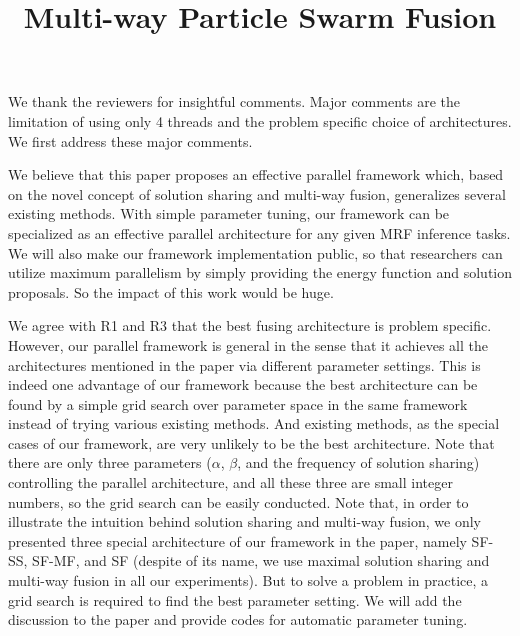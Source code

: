 \documentclass[runningheads]{llncs}
\begin{document}
\pagestyle{headings}
\mainmatter
\def\ECCV16SubNumber{1569}  %

\title{Multi-way Particle Swarm Fusion}

\maketitle
\thispagestyle{empty}


We thank the reviewers for insightful comments. Major comments are
the limitation of using only 4 threads and the problem specific choice of architectures. We first address these major comments.

\vspace{0.15cm}
 We
believe that this paper proposes an effective parallel
framework which, based on the novel concept of solution
sharing and multi-way fusion, generalizes several existing
methods. With simple parameter tuning, our framework can be
specialized as an effective parallel architecture for any
given MRF inference tasks. We will also make our framework
implementation public, so that researchers can utilize
maximum parallelism by simply providing the energy function
and solution proposals. So the impact of this work would be
huge.

\vspace{0.15cm}
 We agree with
R1 and R3 that the best fusing architecture is problem
specific. However, our parallel framework is general in the
sense that it achieves all the architectures mentioned in
the paper via different parameter settings. This is indeed
one advantage of our framework because the best architecture
can be found by a simple grid search over parameter space in
the same framework instead of trying various existing
methods. And existing methods, as the special cases of our
framework, are very unlikely to be the best
architecture. Note that there are only three parameters
($\alpha$, $\beta$, and the frequency of solution sharing)
controlling the parallel architecture, and all these three
are small integer numbers, so the grid search can be
easily conducted. Note that, in order to illustrate the
intuition behind solution sharing and multi-way fusion, we
only presented three special architecture of our framework
in the paper, namely SF-SS, SF-MF, and SF (despite of its
name, we use maximal solution sharing and multi-way fusion
in all our experiments). But to solve a problem in practice,
a grid search is required to find the best parameter
setting. We will add the discussion to the paper and
provide codes for automatic parameter tuning.
\end{document}
